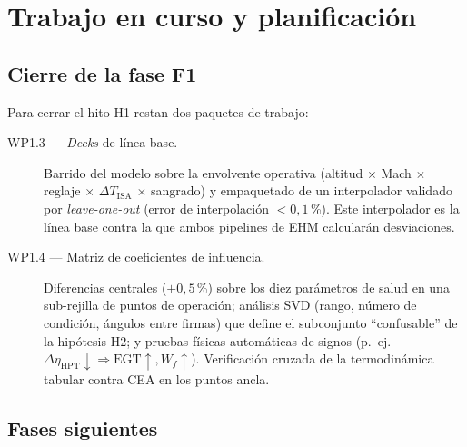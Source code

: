 \chapter{Trabajo en curso y planificación}
\label{cap:trabajo-en-curso}

\section{Cierre de la fase F1}

Para cerrar el hito H1 restan dos paquetes de trabajo:

\begin{description}
  \item[WP1.3 — \emph{Decks} de línea base.] Barrido del modelo sobre la envolvente operativa
    (altitud $\times$ Mach $\times$ reglaje $\times$ $\Delta T_{\mathrm{ISA}}$ $\times$
    sangrado) y empaquetado de un interpolador validado por \emph{leave-one-out}
    (error de interpolación $<0{,}1$\,\%). Este interpolador es la línea base contra la que
    ambos pipelines de EHM calcularán desviaciones.
  \item[WP1.4 — Matriz de coeficientes de influencia.] Diferencias centrales ($\pm0{,}5$\,\%)
    sobre los diez parámetros de salud en una sub-rejilla de puntos de operación; análisis SVD
    (rango, número de condición, ángulos entre firmas) que define el subconjunto ``confusable''
    de la hipótesis H2; y pruebas físicas automáticas de signos (p.\ ej.\
    $\Delta\eta_{\mathrm{HPT}}\downarrow \Rightarrow \mathrm{EGT}\uparrow, W_f\uparrow$).
    Verificación cruzada de la termodinámica tabular contra CEA en los puntos ancla.
\end{description}

\section{Fases siguientes}


